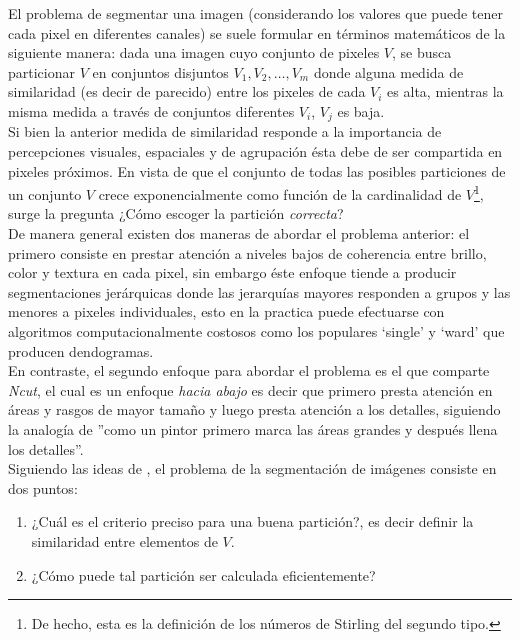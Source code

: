 \documentclass[conference]{IEEEtran}
\begin{document}
El problema de segmentar una imagen (considerando los valores que puede tener cada pixel en diferentes canales) se suele formular en términos matemáticos de la siguiente manera: dada una imagen cuyo conjunto de pixeles $V$, se busca particionar $V$ en conjuntos disjuntos $V_1,V_2, \dots,V_m$ donde alguna medida de similaridad (es decir de parecido) entre los pixeles de cada $V_i$ es alta, mientras la misma medida a través de conjuntos diferentes $V_i$, $V_j$ es baja.\\

Si bien la anterior medida de similaridad responde a la importancia de percepciones visuales, espaciales y de agrupación ésta debe de ser compartida en pixeles próximos. En vista de que el conjunto de todas las posibles particiones de un conjunto $V$ crece exponencialmente como función de la cardinalidad de $V$\footnote{De hecho, esta es la definición de los números de Stirling del segundo tipo.}, surge la pregunta ¿Cómo escoger la partición \textit{correcta}?\\

De manera general existen dos maneras de abordar el problema anterior: el primero consiste en prestar atención a niveles bajos de coherencia entre brillo, color y textura en cada pixel, sin embargo éste enfoque tiende a producir segmentaciones jerárquicas donde las jerarquías mayores responden a grupos y las menores a pixeles individuales, esto en la practica puede efectuarse con algoritmos computacionalmente costosos como los populares ‘single’ y ‘ward’ que producen dendogramas.\\

En contraste, el segundo enfoque para abordar el problema es el que comparte \textit{Ncut}, el cual es un enfoque \textit{hacia abajo} es decir que primero presta atención en áreas y rasgos de mayor tamaño y luego presta atención a los detalles, siguiendo la analogía de \cite{Ncut} ''como un pintor primero marca las áreas grandes y después llena los detalles''.\\

Siguiendo las ideas de \cite{Ncut}, el problema de la segmentación de imágenes consiste en dos puntos: \\
\begin{enumerate}
\item ¿Cuál es el criterio preciso para una buena partición?, es decir definir la similaridad entre elementos de $V$. 
\item ¿Cómo puede tal partición ser calculada eficientemente?\\
\end{enumerate}  
\end{document}

